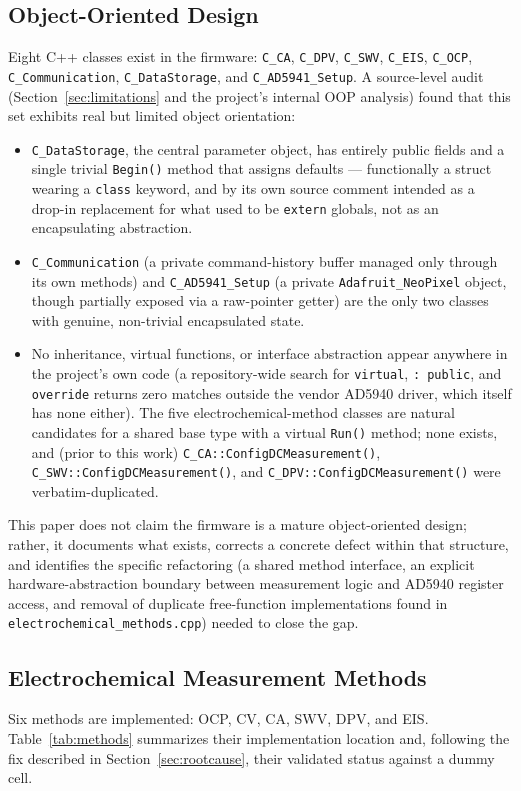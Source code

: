 \documentclass[preprint,12pt]{elsarticle}
\begin{document}
\subsection{Object-Oriented Design}
\label{sec:oop}
Eight C++ classes exist in the firmware: \texttt{C\_CA}, \texttt{C\_DPV}, \texttt{C\_SWV}, \texttt{C\_EIS}, \texttt{C\_OCP}, \texttt{C\_Communication}, \texttt{C\_DataStorage}, and \texttt{C\_AD5941\_Setup}. A source-level audit (Section~\ref{sec:limitations} and the project's internal OOP analysis) found that this set exhibits real but limited object orientation:
\begin{itemize}
\item \texttt{C\_DataStorage}, the central parameter object, has entirely public fields and a single trivial \texttt{Begin()} method that assigns defaults --- functionally a struct wearing a \texttt{class} keyword, and by its own source comment intended as a drop-in replacement for what used to be \texttt{extern} globals, not as an encapsulating abstraction.
\item \texttt{C\_Communication} (a private command-history buffer managed only through its own methods) and \texttt{C\_AD5941\_Setup} (a private \texttt{Adafruit\_NeoPixel} object, though partially exposed via a raw-pointer getter) are the only two classes with genuine, non-trivial encapsulated state.
\item No inheritance, virtual functions, or interface abstraction appear anywhere in the project's own code (a repository-wide search for \texttt{virtual}, \texttt{: public}, and \texttt{override} returns zero matches outside the vendor AD5940 driver, which itself has none either). The five electrochemical-method classes are natural candidates for a shared base type with a virtual \texttt{Run()} method; none exists, and (prior to this work) \texttt{C\_CA::ConfigDCMeasurement()}, \texttt{C\_SWV::ConfigDCMeasurement()}, and \texttt{C\_DPV::ConfigDCMeasurement()} were verbatim-duplicated.
\end{itemize}
This paper does not claim the firmware is a mature object-oriented design; rather, it documents what exists, corrects a concrete defect within that structure, and identifies the specific refactoring (a shared method interface, an explicit hardware-abstraction boundary between measurement logic and AD5940 register access, and removal of duplicate free-function implementations found in \texttt{electrochemical\_methods.cpp}) needed to close the gap.

\subsection{Electrochemical Measurement Methods}
Six methods are implemented: OCP, CV, CA, SWV, DPV, and EIS. Table~\ref{tab:methods} summarizes their implementation location and, following the fix described in Section~\ref{sec:rootcause}, their validated status against a dummy cell.
\end{document}
